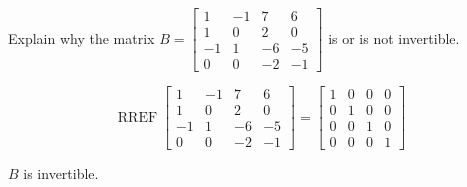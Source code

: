 
\begin{exerciseStatement}


Explain why the matrix \(B= \left[\begin{array}{cccc}
1 & -1 & 7 & 6 \\
1 & 0 & 2 & 0 \\
-1 & 1 & -6 & -5 \\
0 & 0 & -2 & -1
\end{array}\right] \) is or is not invertible.


\end{exerciseStatement}
    
\begin{exerciseAnswer} 


\[\operatorname{RREF} \left[\begin{array}{cccc}
1 & -1 & 7 & 6 \\
1 & 0 & 2 & 0 \\
-1 & 1 & -6 & -5 \\
0 & 0 & -2 & -1
\end{array}\right] = \left[\begin{array}{cccc}
1 & 0 & 0 & 0 \\
0 & 1 & 0 & 0 \\
0 & 0 & 1 & 0 \\
0 & 0 & 0 & 1
\end{array}\right] \]

\(B\) is invertible.
\end{exerciseAnswer}
    
